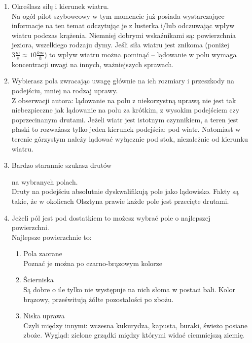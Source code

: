 \documentclass{article}
\begin{document}
\begin{enumerate}
\item Określasz siłę i kierunek wiatru. \\
    Na ogół pilot szybowcowy w tym momencie już posiada
    wystarczające informacje na ten temat odczytując je z lusterka i/lub
    odczuwając wpływ wiatru podczas krążenia. Niemniej dobrymi wskaźnikami są:
    powierzchnia jeziora, wszelkiego rodzaju dymy. Jeśli siła wiatru jest
    znikoma (poniżej $3\frac{m}{s} \approx 10\frac{km}{h}$) to wpływ
    wiatru można pominąć -- lądowanie w polu wymaga koncentracji uwagi
    na innych, ważniejszych sprawach.

\item Wybierasz pola zwracając uwagę głównie na ich rozmiary i przeszkody na
    podejściu, mniej na rodzaj uprawy.\\
    Z obserwacji autora: lądowanie
    na polu z niekorzystną uprawą nie jest tak niebezpieczne jak lądowanie
    na polu za krótkim, z wysokim podejściem czy poprzecinanym drutami.
    Jeżeli wiatr jest istotnym czynnikiem, a teren jest płaski
    to rozważasz tylko jeden kierunek podejścia: pod wiatr. Natomiast
    w terenie górzystym należy lądować wyłącznie pod stok, niezależnie
    od kierunku wiatru.

\item \begin{bf}Bardzo starannie szukasz drutów\end{bf} na wybranych
    polach.\\
    Druty na podejściu absolutnie dyskwalifikują pole jako lądowisko.
    Fakty są takie, że w okolicach Olsztyna prawie każde pole jest
    przecięte drutami.

\item Jeżeli pól jest pod dostatkiem to możesz wybrać pole o najlepszej
    powierzchni. \\
    Najlepsze powierzchnie to:
    \begin{enumerate}
        \item Pola zaorane \\
            Poznać je można po czarno-brązowym kolorze
        \item Ścierniska \\
            Są dobre o ile tylko nie występuje na nich słoma w postaci bali.
            Kolor brązowy, prześwitują żółte pozostałości po zbożu.
        \item Niska uprawa \\
            Czyli między innymi: wczesna kukurydza, kapusta, buraki, świeżo
            posiane zboże. Wygląd: zielone grządki między którymi
            widać ciemniejszą ziemię.
    \end{enumerate}
\end{enumerate}
\end{document}

